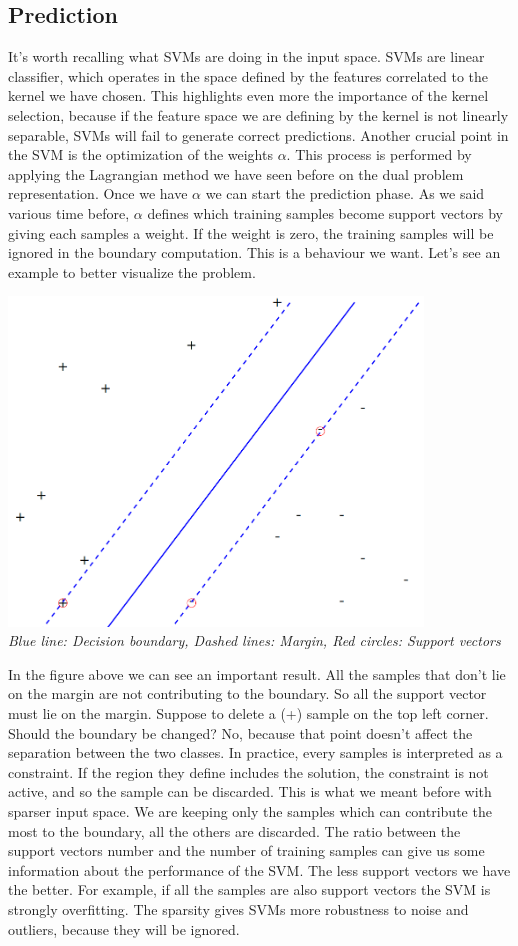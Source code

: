 \documentclass[../main.tex]{subfiles}
\begin{document}
\subsection{Prediction} It's worth recalling what SVMs are doing in the input space. SVMs are linear classifier, which operates in the space defined by the features correlated to the kernel we have chosen. This highlights even more the importance of the kernel selection, because if the feature space we are defining by the kernel is not linearly separable, SVMs will fail to generate correct predictions. Another crucial point in the SVM is the optimization of the weights $\alpha$. This process is performed by applying the Lagrangian method we have seen before on the dual problem representation. Once we have $\alpha$ we can start the prediction phase.
As we said various time before, $\alpha$ defines which training samples become support vectors by giving each samples a weight. If the weight is zero, the training samples will be ignored in the boundary computation. This is a behaviour we want. Let's see an example to better visualize the problem.
\begin{center}
    \includegraphics[width=110mm]{images/SVM_Visualization.PNG} \\
    \textit{Blue line: Decision boundary, Dashed lines: Margin, Red circles: Support vectors}
\end{center}
In the figure above we can see an important result. All the samples that don't lie on the margin are not contributing to the boundary. So all the support vector must lie on the margin. Suppose to delete a (+) sample on the top left corner. Should the boundary be changed? No, because that point doesn't affect the separation between the two classes. In practice, every samples is interpreted as a constraint. If the region they define includes the solution, the constraint is not active, and so the sample can be discarded. This is what we meant before with sparser input space. We are keeping only the samples which can contribute the most to the boundary, all the others are discarded. The ratio between the support vectors number and the number of training samples can give us some information about the performance of the SVM. The less support vectors we have the better. For example, if all the samples are also support vectors the SVM is strongly overfitting. The sparsity gives SVMs more robustness to noise and outliers, because they will be ignored.
\end{document}
